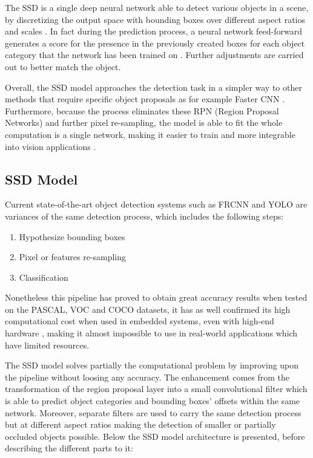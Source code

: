 The SSD is a single deep neural network able to detect various objects in a scene, by discretizing the output space with bounding boxes over different aspect ratios and scales \cite{paper:SSD}. In fact during the prediction process, a neural network feed-forward generates a score for the presence in the previously created boxes for each object category that the network has been trained on \cite{paper:SSD}. Further adjustments are carried out to better match the object.  

Overall, the SSD model approaches the detection task in a simpler way to other methods that require specific object proposals as for example Faster CNN \cite{paper:FRCNN}. Furthermore, because the process eliminates these RPN (Region Proposal Networks) and further pixel re-sampling, the model is able to fit the whole computation is a single network, making it easier to train and more integrable into vision applications \cite{paper:SSD}.

\subsection{SSD Model}

Current state-of-the-art object detection systems such as FRCNN \cite{paper:FRCNN} and YOLO \cite{paper:YOLO} are variances of the same detection process, which includes the following steps:

\begin{enumerate}
  \item Hypothesize bounding boxes
  \item Pixel or features re-sampling
  \item Classification
\end{enumerate}

Nonetheless this pipeline has proved to obtain great accuracy results when tested on the PASCAL, VOC and COCO datasets, it has as well confirmed its high computational cost when used in embedded systems, even with high-end hardware \cite{paper:SSD}, making it almost impossible to use in real-world applications which have limited resources.

The SSD model solves partially the computational problem by improving upon the pipeline without loosing any accuracy. The enhancement comes from the transformation of the region proposal layer into a small convolutional filter which is able to predict object categories and bounding boxes' offsets within the same network. Moreover, separate filters are used to carry the same detection process but at different aspect ratios making the detection of smaller or partially occluded objects possible. Below the SSD model architecture is presented, before describing the different parts to it:

